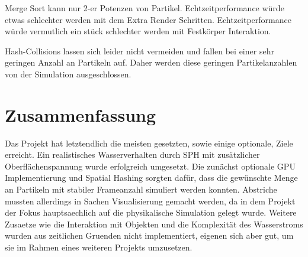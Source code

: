 \documentclass[a4paper]{paper}
\begin{document}
Merge Sort kann nur 2-er Potenzen von Partikel.
Echtzeitperformance würde etwas schlechter werden mit dem Extra Render Schritten.
Echtzeitperformance würde vermutlich ein stück schlechter werden mit Festkörper Interaktion. 


Hash-Collisions lassen sich leider nicht vermeiden und fallen bei einer sehr geringen Anzahl an Partikeln auf. Daher werden diese geringen Partikelanzahlen von der Simulation ausgeschlossen.
\section{Zusammenfassung}

Das Projekt hat letztendlich die meisten gesetzten, sowie einige optionale, Ziele erreicht. Ein realistisches Wasserverhalten durch SPH mit zusätzlicher Oberflächenspannung wurde erfolgreich umgesetzt. Die zunächst optionale GPU Implementierung und Spatial Hashing sorgten dafür, dass die gewünschte Menge an Partikeln mit stabiler Frameanzahl simuliert werden konnten. Abstriche mussten allerdings in Sachen Visualisierung gemacht werden, da in dem Projekt der Fokus hauptsaechlich auf die physikalische Simulation gelegt wurde. Weitere Zusaetze wie die Interaktion mit Objekten und die Komplexität des Wasserstroms wurden aus zeitlichen Gruenden nicht implementiert, eigenen sich aber gut, um sie im Rahmen eines weiteren Projekts umzusetzen.




\end{document}
